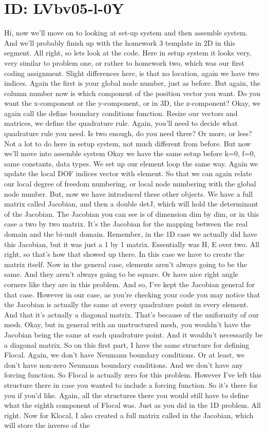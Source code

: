 \documentclass[10pt]{article}
\begin{document}
\section*{ID: LVbv05-l-0Y}
Hi, now we'll move on to looking at set-up system and then assemble system. And we'll probably finish up with the homework 3 template in 2D in this segment. All right, so lets look at the code. Here in setup system it looks very, very similar to problem one, or rather to homework two, which was our first coding assignment. Slight differences here, is that no location, again we have two indices. Again the first is your global node number, just as before. But again, the column number now is which component of the position vector you want. Do you want the x-component or the y-component, or in 3D, the z-component? Okay, we again call the define boundary conditions function. Resize our vectors and matrices, we define the quadrature rule. Again, you'll need to decide what quadrature rule you need. Is two enough, do you need three? Or more, or less? Not a lot to do here in setup system, not much different from before. But now we'll move into assemble system Okay we have the same setup before k=0, f=0, same constants, data types. We set up our element loop the same way. Again we update the local DOF indices vector with element. So that we can again relate our local degree of freedom numbering, or local node numbering with the global node number. But, now we have introduced these other objects. We have a full matrix called Jacobian, and then a double detJ, which will hold the determinant of the Jacobian. The Jacobian you can see is of dimension dim by dim, or in this case a two by two matrix. It's the Jacobian for the mapping between the real domain and the bi-unit domain. Remember, in the 1D case we actually did have this Jacobian, but it was just a 1 by 1 matrix. Essentially was H, E over two. All right, so that's how that showed up there. In this case we have to create the matrix itself. Now in the general case, elements aren't always going to be the same. And they aren't always going to be square. Or have nice right angle corners like they are in this problem. And so, I've kept the Jacobian general for that case. However in our case, as you're checking your code you may notice that the Jacobian is actually the same at every quadrature point in every element. And that it's actually a diagonal matrix. That's because of the uniformity of our mesh. Okay, but in general with an unstructured mesh, you wouldn't have the Jacobian being the same at each quadrature point. And it wouldn't necessarily be a diagonal matrix. So on this first part, I have the same structure for defining Flocal. Again, we don't have Neumann boundary conditions. Or at least, we don't have non-zero Neumann boundary conditions. And we don't have any forcing function. So Flocal is actually zero for this problem. However I've left this structure there in case you wanted to include a forcing function. So it's there for you if you'd like. Again, all the structures there you would still have to define what the eighth component of Flocal was. Just as you did in the 1D problem. All right. Now for Klocal, I also created a full matrix called in the Jacobian, which will store the inverse of the 
\end{document}
